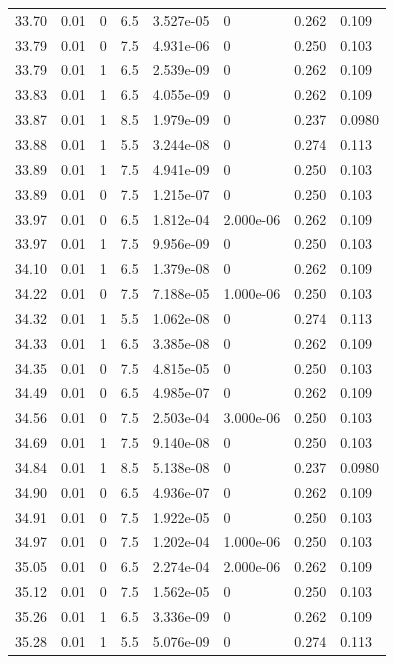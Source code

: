\documentclass[preview]{standalone}
\begin{document}
{{{{{{{{{{{\begin{tabular}{L{1.2cm}C{1.2cm} C{0.3cm}C{0.5cm} C{1.4cm}C{1.4cm} C{1.4cm}C{1.4cm}}
  33.70  &  0.01  & 0     & 6.5 &  3.527e-05  & 0  & 0.262 &  0.109   \\ 
  33.79  &  0.01  & 0     & 7.5 &  4.931e-06  & 0  & 0.250 &  0.103   \\ 
  33.79  &  0.01  & 1     & 6.5 &  2.539e-09  & 0  & 0.262 &  0.109   \\ 
  33.83  &  0.01  & 1     & 6.5 &  4.055e-09  & 0  & 0.262 &  0.109   \\ 
  33.87  &  0.01  & 1     & 8.5 &  1.979e-09  & 0  & 0.237 &  0.0980   \\ 
  33.88  &  0.01  & 1     & 5.5 &  3.244e-08  & 0  & 0.274 &  0.113   \\ 
  33.89  &  0.01  & 1     & 7.5 &  4.941e-09  & 0  & 0.250 &  0.103   \\ 
  33.89  &  0.01  & 0     & 7.5 &  1.215e-07  & 0  & 0.250 &  0.103   \\ 
  33.97  &  0.01  & 0     & 6.5 &  1.812e-04  & 2.000e-06  & 0.262 &  0.109   \\ 
  33.97  &  0.01  & 1     & 7.5 &  9.956e-09  & 0  & 0.250 &  0.103   \\ 
  34.10  &  0.01  & 1     & 6.5 &  1.379e-08  & 0  & 0.262 &  0.109   \\ 
  34.22  &  0.01  & 0     & 7.5 &  7.188e-05  & 1.000e-06  & 0.250 &  0.103   \\ 
  34.32  &  0.01  & 1     & 5.5 &  1.062e-08  & 0  & 0.274 &  0.113   \\ 
  34.33  &  0.01  & 1     & 6.5 &  3.385e-08  & 0  & 0.262 &  0.109   \\ 
  34.35  &  0.01  & 0     & 7.5 &  4.815e-05  & 0  & 0.250 &  0.103   \\ 
  34.49  &  0.01  & 0     & 6.5 &  4.985e-07  & 0  & 0.262 &  0.109   \\ 
  34.56  &  0.01  & 0     & 7.5 &  2.503e-04  & 3.000e-06  & 0.250 &  0.103   \\ 
  34.69  &  0.01  & 1     & 7.5 &  9.140e-08  & 0  & 0.250 &  0.103   \\ 
  34.84  &  0.01  & 1     & 8.5 &  5.138e-08  & 0  & 0.237 &  0.0980   \\ 
  34.90  &  0.01  & 0     & 6.5 &  4.936e-07  & 0  & 0.262 &  0.109   \\ 
  34.91  &  0.01  & 0     & 7.5 &  1.922e-05  & 0  & 0.250 &  0.103   \\ 
  34.97  &  0.01  & 0     & 7.5 &  1.202e-04  & 1.000e-06  & 0.250 &  0.103   \\ 
  35.05  &  0.01  & 0     & 6.5 &  2.274e-04  & 2.000e-06  & 0.262 &  0.109   \\ 
  35.12  &  0.01  & 0     & 7.5 &  1.562e-05  & 0  & 0.250 &  0.103   \\ 
  35.26  &  0.01  & 1     & 6.5 &  3.336e-09  & 0  & 0.262 &  0.109   \\ 
  35.28  &  0.01  & 1     & 5.5 &  5.076e-09  & 0  & 0.274 &  0.113   \\ 
\hline 
\end{tabular} 

}}}}}}}}}}}
\end{document}
